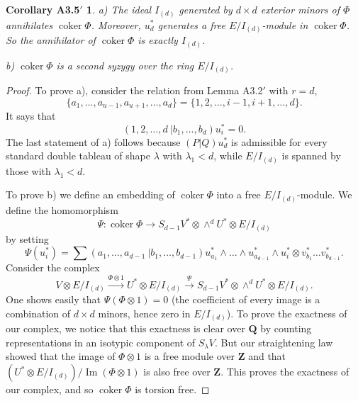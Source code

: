 \documentclass{tran-l}
\theoremstyle{plain}
\newtheorem*{theorem26}{Corollary A3.5$'$}
\theoremstyle{remark}
\theoremstyle{definition}
\newcommand{\coker}{\operatorname{coker}}
\begin{document}
\begin{theorem26}
\textup{a)} The ideal $I_{(d)}$ generated by $d\times d$ exterior minors
of $\Phi $ annihilates $\coker \Phi $. Moreover, $u_{d}^{*}$ generates
a free $E/I_{(d)}$-module in $\coker \Phi $. So the annihilator
of $\coker \Phi $ is exactly $I_{(d)}$.

\textup{b)} $\coker \Phi $ is a second syzygy over the
ring $E/I_{(d)}$.
\end{theorem26}
\begin{proof} To prove a), consider the relation from 
Lemma A3.2$'$
with $r=d$,  
\begin{equation*}\lbrace a_{1} ,\ldots , a_{u-1}, a_{u+1},\ldots ,a_{d}\rbrace = \lbrace 1,2,\ldots , i-1,i+1,\ldots ,d\rbrace .
\end{equation*}
 It says that
\begin{equation*}(1,2,\ldots ,d\ |b_{1} ,\ldots ,b_{d} )u_{i}^{*}=0 .
\end{equation*}
The last statement of a) follows because 
$(P|Q)u_{d}^{*}$ is admissible
for every standard double tableau of shape $\lambda $
with $\lambda _{1}<d$, while
$E/I_{(d)}$ is spanned by those with $\lambda _{1}<d$.

To prove b) we define an embedding of $\coker \Phi $ into a free
$E/I_{(d)}$-module. We define the homomorphism
\begin{equation*}\Psi :\coker \Phi \rightarrow S_{d-1}V^{*}\otimes \wedge ^{d}
U^{*}\otimes E/I_{(d)}\end{equation*}
by setting 
\begin{equation*}\Psi (u_{i}^{*} ) =\sum (a_{1} ,\ldots , a_{d-1}\ |b_{1} ,\ldots ,b_{d-1} ) u_{a_{1}}^{*}\wedge \ldots \wedge u_{a_{d-1}}^{*}\wedge u_{i}^{*}\otimes v_{b_{1}}^{*}\ldots v_{b_{d-1}}^{*} .\end{equation*}
Consider the complex
\begin{equation*}V\otimes E/I_{(d)} {\overset{{\Phi \otimes 1}}{\longrightarrow }}
U^{*}\otimes E/I_{(d)} {\overset{\Psi }{\longrightarrow }}S_{d-1}V^{*}\otimes \wedge ^{d}
U^{*}\otimes E/I_{(d)}. \end{equation*}
 One shows easily that $\Psi (\Phi \otimes 1)=0$ (the coefficient of every image is a combination of
$d\times d$ minors, hence zero in $E/I_{(d)}$).
To prove the exactness of our complex, we notice that this exactness is clear over
$\mathbf{Q}$ by counting representations in an isotypic component of $S_{\lambda }V$. But
our straightening law showed that the image of $\Phi \otimes 1$ is a free module
over $\mathbf{Z}$ and that $(U^{*}\otimes E/I_{(d)} )/
\operatorname{Im}(\Phi \otimes 1)$ is also free over
$\mathbf{Z}$. This proves the exactness of our complex, 
and so $\coker \Phi $ is torsion free.


\end{proof}
\end{document}
